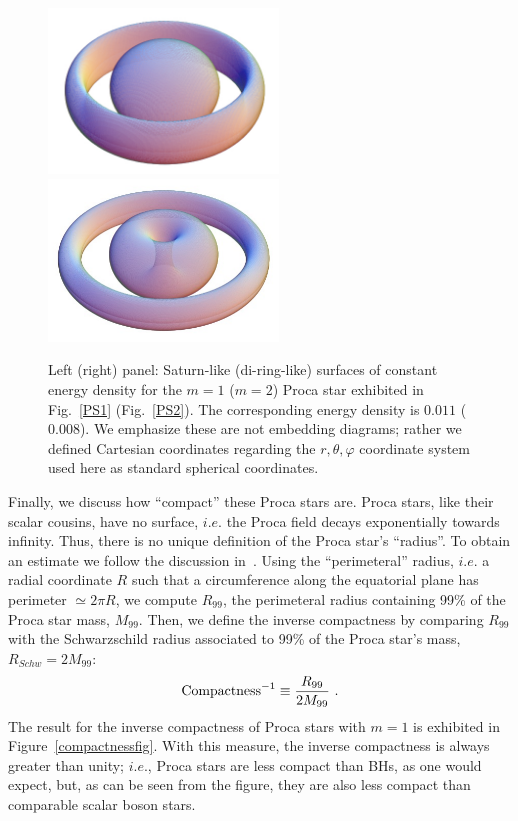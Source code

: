 \begin{figure}[h!]
  \begin{center}
    \includegraphics[width=6.1cm]{papers/Proca/3DPS1-m=1-v2.pdf} \qquad \qquad 
    \includegraphics[width=6.1cm]{papers/Proca/3DPS1-m=2-v2.pdf}   
         \end{center}
 \caption{Left (right) panel: Saturn-like (di-ring-like) surfaces of constant energy density for the $m=1$ ($m=2$) Proca star exhibited in Fig.~\ref{PS1} (Fig.~\ref{PS2}). The corresponding energy density is $0.011$ ($0.008$). We emphasize these are not embedding diagrams; rather we defined Cartesian coordinates regarding the $r,\theta,\varphi$ coordinate system used here as standard spherical coordinates.}
  \label{3D}
\end{figure}

Finally, we discuss how ``compact'' these Proca stars are.
Proca stars, like their scalar cousins, have no surface, $i.e.$ the Proca field decays exponentially towards infinity.
Thus, there is no unique definition of the Proca star's ``radius''.
To obtain an estimate we follow the discussion in~\cite{AmaroSeoane:2010qx,Herdeiro:2015gia}.
Using the ``perimeteral'' radius, $i.e.$ a radial coordinate $R$ such that a circumference along the equatorial plane has perimeter $\simeq 2\pi R$,  we compute $R_{99}$, the perimeteral radius containing 99\% of the Proca star mass, $M_{99}$. Then, we define the inverse compactness by comparing $R_{99}$ with the Schwarzschild radius associated to 99\% of the Proca star's mass, $R_{Schw}=2M_{99}$:
%
\begin{equation}
{\rm Compactness}^{-1}\equiv  \frac{R_{99}}{2M_{99}} \ .
\label{compactness}
\end{equation}
%
The result for the inverse compactness of Proca stars with $m=1$ is exhibited in Figure~\ref{compactnessfig}.
With this measure, the inverse compactness is always greater than unity; $i.e.$, Proca stars are less compact than BHs, as one would expect, but, as can be seen from the figure, they are also less compact than comparable scalar boson stars.

